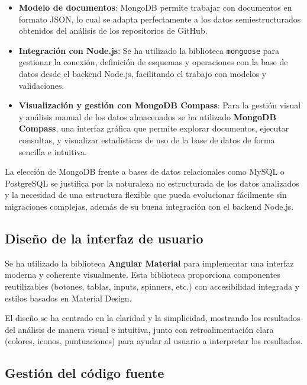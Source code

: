 \begin{itemize}
  \item \textbf{Modelo de documentos}: MongoDB permite trabajar con documentos en formato JSON, lo cual se adapta perfectamente a los datos semiestructurados obtenidos del análisis de los repositorios de GitHub.
  
  \item \textbf{Integración con Node.js}: Se ha utilizado la biblioteca \texttt{mongoose} para gestionar la conexión, definición de esquemas y operaciones con la base de datos desde el backend Node.js, facilitando el trabajo con modelos y validaciones.
  
  \item \textbf{Visualización y gestión con MongoDB Compass}: Para la gestión visual y análisis manual de los datos almacenados se ha utilizado \textbf{MongoDB Compass}, una interfaz gráfica que permite explorar documentos, ejecutar consultas, y visualizar estadísticas de uso de la base de datos de forma sencilla e intuitiva.
  
\end{itemize}

La elección de MongoDB frente a bases de datos relacionales como MySQL o PostgreSQL se justifica por la naturaleza no estructurada de los datos analizados y la necesidad de una estructura flexible que pueda evolucionar fácilmente sin migraciones complejas, además de su buena integración con el backend Node.js.


\subsection{Diseño de la interfaz de usuario}

Se ha utilizado la biblioteca \textbf{Angular Material} para implementar una interfaz moderna y coherente visualmente. Esta biblioteca proporciona componentes reutilizables (botones, tablas, inputs, spinners, etc.) con accesibilidad integrada y estilos basados en Material Design.

El diseño se ha centrado en la claridad y la simplicidad, mostrando los resultados del análisis de manera visual e intuitiva, junto con retroalimentación clara (colores, iconos, puntuaciones) para ayudar al usuario a interpretar los resultados.

\subsection{Gestión del código fuente}


